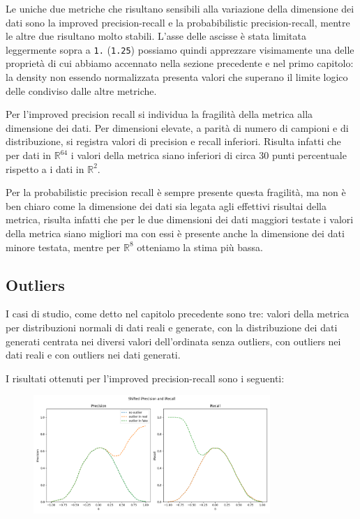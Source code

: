Le uniche due metriche che risultano sensibili alla variazione della dimensione dei dati sono la improved precision-recall e la probabibilistic precision-recall, mentre le altre due risultano molto stabili.
L'asse delle ascisse è stata limitata leggermente sopra a \texttt{1.} (\texttt{1.25}) possiamo quindi apprezzare visimamente una delle proprietà di cui abbiamo accennato nella sezione precedente e nel primo capitolo:
la density non essendo normalizzata presenta valori che superano il limite logico delle condiviso dalle altre metriche.

Per l'improved precision recall si individua la fragilità della metrica alla dimensione dei dati. Per dimensioni elevate, a parità di numero di campioni e di distribuzione, si registra valori di precision e recall inferiori.
Risulta infatti che per dati in \(\mathbb{R}^{64}\) i valori della metrica siano inferiori di circa 30 punti percentuale rispetto a i dati in  \(\mathbb{R}^{2}\).

Per la probabilistic precision recall è sempre presente questa fragilità, ma non è ben chiaro come la dimensione dei dati sia legata agli effettivi risultai della metrica, risulta infatti che per le due dimensioni dei dati maggiori
testate i valori della metrica siano migliori ma con essi è presente anche la dimensione dei dati minore testata, mentre per \(\mathbb{R}^{8}\) otteniamo la stima più bassa.

\subsection{Outliers}

I casi di studio, come detto nel capitolo precedente sono tre: valori della metrica per distribuzioni normali di dati reali e generate, con la distribuzione dei dati generati centrata nei diversi valori dell'ordinata senza outliers, con outliers nei dati reali e con outliers nei dati generati.

I risultati ottenuti per l'improved precision-recall sono i seguenti:

\clearpage

\begin{figure}[h!]
    \centering
    \includegraphics[width=0.8\textwidth]{../images/toyexperiments/outliers/shift_iPrecision_iRecall.png} 
\end{figure}

